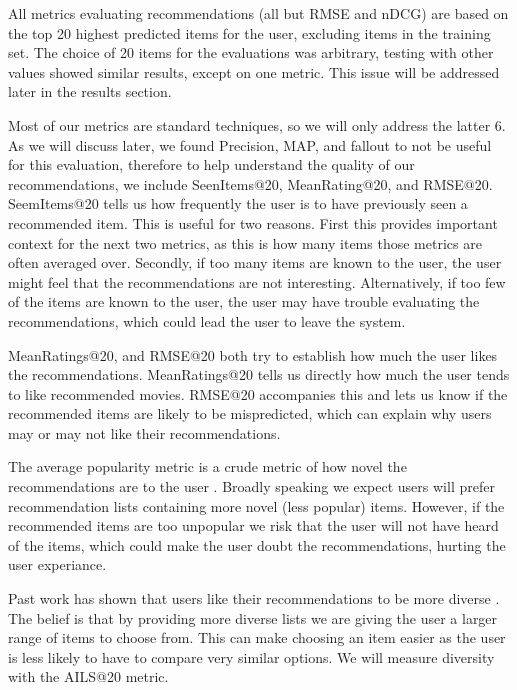 \documentclass[letterpaper]{sig-alternate}
\begin{document}
  All metrics evaluating recommendations (all but RMSE and nDCG) are based on the top 20 highest predicted items for the user, excluding items in the training set.
  The choice of 20 items for the evaluations was arbitrary, testing with other values showed similar results, except on one metric.
  This issue will be addressed later in the results section.
  
  Most of our metrics are standard techniques, so we will only address the latter 6.
  As we will discuss later, we found Precision, MAP, and fallout to not be useful for this evaluation, therefore to help understand the quality of our recommendations, we include SeenItems@20, MeanRating@20, and RMSE@20.
  SeemItems@20 tells us how frequently the user is to have previously seen a recommended item.
  This is useful for two reasons.
  First this provides important context for the next two metrics, as this is how many items those metrics are often averaged over.
  Secondly, if too many items are known to the user, the user might feel that the recommendations are not interesting.
  Alternatively, if too few of the items are known to the user, the user may have trouble evaluating the recommendations, which could lead the user to leave the system.

  \addtocounter{footnote}{1}

  MeanRatings@20, and RMSE@20 both try to establish how much the user likes the recommendations.
  MeanRatings@20 tells us directly how much the user tends to like recommended movies.
  RMSE@20 accompanies this and lets us know if the recommended items are likely to be mispredicted, which can explain why users may or may not like their recommendations.

  The average popularity metric is a crude metric of how novel the recommendations are to the user \cite{zieglerDiversity}.
  Broadly speaking we expect users will prefer recommendation lists containing more novel (less popular) items.
  However, if the recommended items are too unpopular we risk that the user will not have heard of the items, which could make the user doubt the recommendations, hurting the user experiance.

  Past work has shown that users like their recommendations to be more diverse \cite{zieglerDiversity, martijnDiversity}.
  The belief is that by providing more diverse lists we are giving the user a larger range of items to choose from.
  This can make choosing an item easier as the user is less likely to have to compare very similar options.
  We will measure diversity with the AILS@20 metric.
\end{document}
